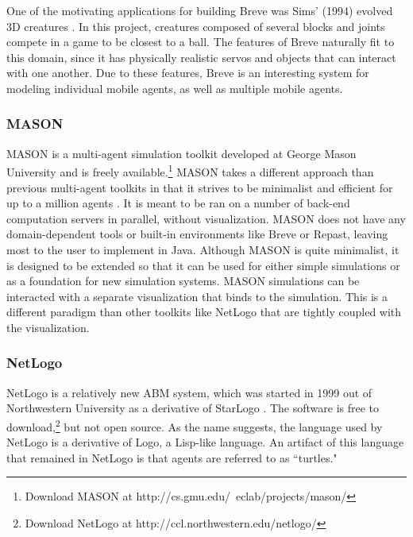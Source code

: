 One of the motivating applications for building Breve was Sims' (1994) evolved 3D creatures \cite{kleinbreve}.
In this project, creatures composed of several blocks and joints compete in a game to be closest to a ball.
The features of Breve naturally fit to this domain, since it has physically realistic servos and objects that can interact with one another.
Due to these features, Breve is an interesting system for modeling individual mobile agents, as well as multiple mobile agents.



\subsubsection{MASON}
MASON is a multi-agent simulation toolkit developed at George Mason University and is freely available.\footnote{Download MASON at http://cs.gmu.edu/~eclab/projects/mason/}
MASON takes a different approach than previous multi-agent toolkits in that it strives to be minimalist and efficient for up to a million agents \cite{Luke}.
It is meant to be ran on a number of back-end computation servers in parallel, without visualization.
MASON does not have any domain-dependent tools or built-in environments like Breve or Repast, leaving most to the user to implement in Java.
Although MASON is quite minimalist, it is designed to be extended so that it can be used for either simple simulations or as a foundation for new simulation systems.
MASON simulations can be interacted with a separate visualization that binds to the simulation.
This is a different paradigm than other toolkits like NetLogo that are tightly coupled with the visualization.


\subsubsection{NetLogo}
NetLogo is a relatively new ABM system, which was started in 1999 out of Northwestern University as a derivative of StarLogo \cite{tisue2004netlogo}.
The software is free to download,\footnote{Download NetLogo at http://ccl.northwestern.edu/netlogo/} but not open source.
As the name suggests, the language used by NetLogo is a derivative of Logo, a Lisp-like language.
An artifact of this language that remained in NetLogo is that agents are referred to as ``turtles."

